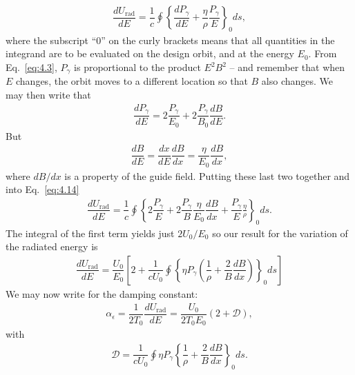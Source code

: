 \begin{align} \label{eq:4.14}
	\dfrac{dU_\text{rad}}{dE} = \dfrac{1}{c} \oint \left\lbrace \dfrac{dP_\gamma}{dE} + \dfrac{\eta}{\rho} \dfrac{P_\gamma}{E} \right\rbrace_0 ds,
\end{align}
where the subscript ``0'' on the curly brackets means that all quantities in the integrand are to be evaluated on the design orbit, and at the energy $E_0$. From Eq.~\eqref{eq:4.3}, $P_\gamma$ is proportional to the product $E^2 B^2$ -- and remember that when $E$ changes, the orbit moves to a different location so that $B$ also changes. We may then write that
\begin{align*}
	\dfrac{dP_\gamma}{dE} = 2 \dfrac{P_\gamma}{E_0} + 2 \dfrac{P_\gamma}{B_0} \dfrac{dB}{dE}.
\end{align*}
But
\begin{align*}
	\dfrac{dB}{dE} = \dfrac{dx}{dE} \dfrac{dB}{dx} = \dfrac{\eta}{E_0} \dfrac{dB}{dx},
\end{align*}
where $dB/dx$ is a property of the guide field. Putting these last two together and into Eq.~\eqref{eq:4.14}
\begin{align*}
	\dfrac{dU_\text{rad}}{dE} = \dfrac{1}{c} \oint \left\lbrace 2 \dfrac{P_\gamma}{E} + 2 \dfrac{P_\gamma}{B} \dfrac{\eta}{E_0} \dfrac{dB}{dx} + \dfrac{P_\gamma}{E} \frac{\eta}{\rho}  \right\rbrace_0 ds.
\end{align*}
The integral
 of the first
 term yields just $2U_0/E_0$ so our result for the variation of the radiated energy is
\begin{align}
	\dfrac{dU_\text{rad}}{dE} = \dfrac{U_0}{E_0} \left[ 2 + \dfrac{1}{cU_0} \oint \left\lbrace \eta P_\gamma \left( \dfrac{1}{\rho} + \dfrac{2}{B} \dfrac{dB}{dx} \right) \right\rbrace_0 ds \right]
\end{align}
We may now write for the damping constant:
\begin{align}\label{eq:4.16}
\alpha_\epsilon = \dfrac{1}{2 T_0} \dfrac{dU_\text{rad}}{dE} = \dfrac{U_0}{2 T_0 E_0} (2 + \mathscr{D}),
\end{align}
with
\begin{align}
	\mathscr{D} = \dfrac{1}{c U_0} \oint \eta P_\gamma \left\lbrace \dfrac{1}{\rho} + \dfrac{2}{B} \dfrac{dB}{dx} \right\rbrace_0 ds.
\end{align}

